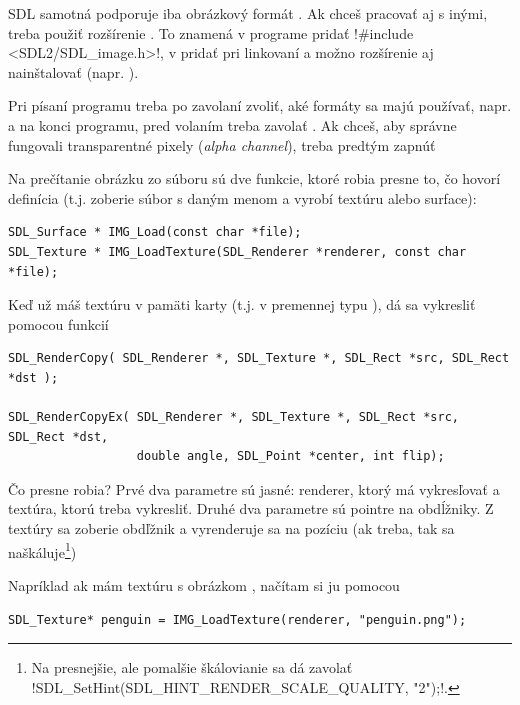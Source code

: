 SDL samotná podporuje iba obrázkový formát . Ak chceš pracovať aj s inými,
treba použiť rozšírenie . To znamená v programe pridať 
\prg!#include <SDL2/SDL_image.h>!, v  pridať pri linkovaní 
a možno rozšírenie aj nainštalovať (napr. ).

Pri písaní programu treba po zavolaní  zvoliť, aké formáty sa majú používať, napr.
 a na konci programu, pred volaním 
treba zavolať . Ak chceš, aby správne fungovali transparentné pixely
({\em alpha channel}), treba predtým zapnúť
\hbox{}


Na prečítanie obrázku zo súboru sú dve funkcie, ktoré robia presne to, čo hovorí definícia (t.j. zoberie súbor s daným menom a vyrobí textúru alebo surface):

\begin{lstlisting}
SDL_Surface * IMG_Load(const char *file);
SDL_Texture * IMG_LoadTexture(SDL_Renderer *renderer, const char *file);
\end{lstlisting}

Keď už máš textúru v pamäti karty (t.j. v premennej typu ), dá sa vykresliť pomocou funkcií

\begin{lstlisting}
SDL_RenderCopy( SDL_Renderer *, SDL_Texture *, SDL_Rect *src, SDL_Rect *dst );

SDL_RenderCopyEx( SDL_Renderer *, SDL_Texture *, SDL_Rect *src, SDL_Rect *dst,
                  double angle, SDL_Point *center, int flip);                
\end{lstlisting}

Čo presne robia? Prvé dva parametre sú jasné: renderer, ktorý má vykresľovať a textúra, ktorú treba vykresliť. Druhé dva parametre sú pointre na obdĺžniky. Z textúry 
sa zoberie obdľžnik  a vyrenderuje sa na pozíciu  (ak treba, tak sa naškáluje\footnote{Na presnejšie, ale pomalšie škálovianie 
sa dá zavolať \prg!SDL_SetHint(SDL_HINT_RENDER_SCALE_QUALITY, "2");!.})

Napríklad ak mám textúru s obrázkom  , načítam si ju pomocou

\begin{lstlisting}
SDL_Texture* penguin = IMG_LoadTexture(renderer, "penguin.png");
\end{lstlisting}

